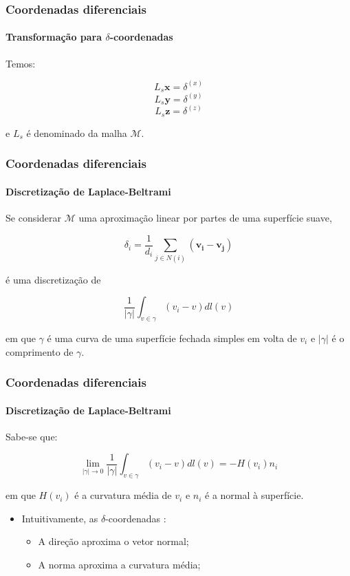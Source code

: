 \begin{frame}
\frametitle{Coordenadas diferenciais}
\framesubtitle{Transformação para $\delta$-coordenadas}

Temos:

$$L_s \textbf{x} = \delta^{(x)}$$
$$L_s \textbf{y} = \delta^{(y)}$$
$$L_s \textbf{z} = \delta^{(z)}$$

e $L_s$ é denominado  da malha $\mathcal M$.

\end{frame}

\begin{frame}
\frametitle{Coordenadas diferenciais}
\framesubtitle{Discretização de Laplace-Beltrami}

Se considerar $\mathcal{M}$ uma aproximação linear por partes de uma superfície suave,

$$\delta_i = \frac{1}{d_i} \sum_{j \in N(i)}(\mathbf{v_i} - \mathbf{v_j})$$

é uma discretização de

$$\frac{1}{|\gamma|} \int_{v \in \gamma} (v_i - v) dl(v)$$

em que $\gamma$ é uma curva de uma superfície fechada simples em volta de $v_i$ e $|\gamma|$ é o comprimento de $\gamma$.

\end{frame}

\begin{frame}
\frametitle{Coordenadas diferenciais}
\framesubtitle{Discretização de Laplace-Beltrami}

Sabe-se que:

$$\lim\limits_{|\gamma|\rightarrow 0} \frac{1}{|\gamma|} \int_{v \in \gamma} (v_i - v) dl(v) = - H(v_i) n_i$$

em que $H(v_i)$ é a curvatura média de $v_i$ e $n_i$ é a normal à superfície.

\medskip

\begin{itemize}
	\item Intuitivamente, as $\delta$-coordenadas :
	\begin{itemize}
		\item A direção aproxima o vetor normal;
		\item A norma aproxima a curvatura média;
	\end{itemize}
\end{itemize}

\end{frame}

